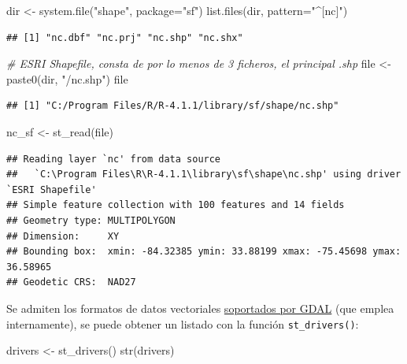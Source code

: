 \documentclass[
  spanish,
]{book}
\newenvironment{Shaded}{\begin{snugshade}}{\end{snugshade}}
\newcommand{\AttributeTok}[1]{\textcolor[rgb]{0.77,0.63,0.00}{#1}}
\newcommand{\CommentTok}[1]{\textcolor[rgb]{0.56,0.35,0.01}{\textit{#1}}}
\newcommand{\FunctionTok}[1]{\textcolor[rgb]{0.00,0.00,0.00}{#1}}
\newcommand{\NormalTok}[1]{#1}
\newcommand{\OtherTok}[1]{\textcolor[rgb]{0.56,0.35,0.01}{#1}}
\newcommand{\StringTok}[1]{\textcolor[rgb]{0.31,0.60,0.02}{#1}}
\theoremstyle{break}
\theoremstyle{definition}
\theoremstyle{definition}
\theoremstyle{definition}
\theoremstyle{definition}
\theoremstyle{remark}
\begin{document}
\begin{Shaded}
\begin{Highlighting}[]
\NormalTok{dir }\OtherTok{\textless{}{-}} \FunctionTok{system.file}\NormalTok{(}\StringTok{"shape"}\NormalTok{, }\AttributeTok{package=}\StringTok{"sf"}\NormalTok{)}
\FunctionTok{list.files}\NormalTok{(dir, }\AttributeTok{pattern=}\StringTok{"\^{}[nc]"}\NormalTok{)}
\end{Highlighting}
\end{Shaded}

\begin{verbatim}
## [1] "nc.dbf" "nc.prj" "nc.shp" "nc.shx"
\end{verbatim}

\begin{Shaded}
\begin{Highlighting}[]
\CommentTok{\# ESRI Shapefile, consta de por lo menos de 3 ficheros, el principal .shp}
\NormalTok{file }\OtherTok{\textless{}{-}} \FunctionTok{paste0}\NormalTok{(dir, }\StringTok{"/nc.shp"}\NormalTok{)}
\NormalTok{file}
\end{Highlighting}
\end{Shaded}

\begin{verbatim}
## [1] "C:/Program Files/R/R-4.1.1/library/sf/shape/nc.shp"
\end{verbatim}

\begin{Shaded}
\begin{Highlighting}[]
\NormalTok{nc\_sf }\OtherTok{\textless{}{-}} \FunctionTok{st\_read}\NormalTok{(file)}
\end{Highlighting}
\end{Shaded}

\begin{verbatim}
## Reading layer `nc' from data source 
##   `C:\Program Files\R\R-4.1.1\library\sf\shape\nc.shp' using driver `ESRI Shapefile'
## Simple feature collection with 100 features and 14 fields
## Geometry type: MULTIPOLYGON
## Dimension:     XY
## Bounding box:  xmin: -84.32385 ymin: 33.88199 xmax: -75.45698 ymax: 36.58965
## Geodetic CRS:  NAD27
\end{verbatim}

Se admiten los formatos de datos vectoriales \href{https://gdal.org/drivers/vector/index.html}{soportados por GDAL} (que emplea internamente),
se puede obtener un listado con la función \texttt{st\_drivers()}:

\begin{Shaded}
\begin{Highlighting}[]
\NormalTok{drivers }\OtherTok{\textless{}{-}} \FunctionTok{st\_drivers}\NormalTok{()}
\FunctionTok{str}\NormalTok{(drivers)}
\end{Highlighting}
\end{Shaded}
\end{document}
